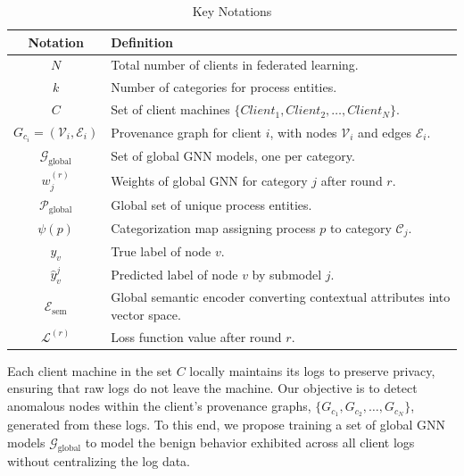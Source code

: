   \begin{table}[!ht]
    \centering
    \scriptsize
    \caption{Key Notations}
    \label{tab:keynotations}
    \begin{tabular}{|c|p{4cm}|}
    \hline
    \textbf{Notation} & \textbf{Definition} \\ \hline
    \( N \) & Total number of clients in federated learning. \\ \hline
    \( k \) & Number of categories for process entities. \\ \hline
    \( C \) & Set of client machines \(\{Client_1, Client_2, \ldots, Client_N\}\). \\ \hline
    \( G_{c_i} = (\mathcal{V}_i, \mathcal{E}_i) \) & Provenance graph for client \( i \), with nodes \( \mathcal{V}_i \) and edges \( \mathcal{E}_i \). \\ \hline
    \( \mathcal{G}_{\text{global}} \) & Set of global GNN models, one per category. \\ \hline
    \( w_j^{(r)} \) & Weights of global GNN for category \( j \) after round \( r \). \\ \hline
    \( \mathcal{P}_{\text{global}} \) & Global set of unique process entities. \\ \hline
    \( \psi(p) \) & Categorization map assigning process \( p \) to category \( \mathcal{C}_j \). \\ \hline
    \( y_v \) & True label of node \( v \). \\ \hline
    \( \hat{y}_v^j \) & Predicted label of node \( v \) by submodel \( j \). \\ \hline
    \( \mathcal{E}_{\text{sem}} \) & Global semantic encoder converting contextual attributes into vector space. \\ \hline
    \( \mathcal{L}^{(r)} \) & Loss function value after round \( r \). \\ \hline
    \end{tabular}
  \end{table}

Each client machine in the set \( C \) locally maintains its logs to preserve privacy, ensuring that raw logs do not leave the machine. Our objective is to detect anomalous nodes within the client's provenance graphs, \( \{G_{c_1}, G_{c_2}, \ldots, G_{c_N}\} \), generated from these logs. To this end, we propose training a set of global GNN models \( \mathcal{G}_{\text{global}} \) to model the benign behavior exhibited across all client logs without centralizing the log data.

